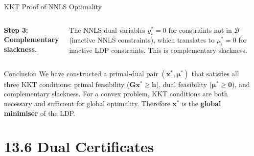 \documentclass[aspectratio=169,10pt]{beamer}
\newcommand{\bx}{\mathbf{x}}
\newcommand{\bG}{\mathbf{G}}
\newcommand{\bh}{\mathbf{h}}
\newcommand{\bmu}{\boldsymbol{\mu}}
\begin{document}
\begin{frame}[allowframebreaks]{KKT Proof of NNLS Optimality}
\begin{columns}[T]
      \textbf{Step 3: Complementary slackness.}

      The NNLS dual variables $y_i^* = 0$ for constraints not in $\mathcal{B}$
      (inactive NNLS constraints), which translates to $\mu_i^* = 0$ for inactive
      LDP constraints.  This is complementary slackness. \checkmark
  \end{columns}

  \begin{alertblock}{Conclusion}
    We have constructed a primal-dual pair $(\bx^*, \bmu^*)$ that satisfies all
    three KKT conditions: primal feasibility ($\bG\bx^* \geq \bh$), dual
    feasibility ($\bmu^* \geq \mathbf{0}$), and complementary slackness.  For a
    convex problem, KKT conditions are both necessary and sufficient for global
    optimality.  Therefore $\bx^*$ is the \textbf{global minimiser} of the LDP.
  \end{alertblock}

\end{frame}

\section{13.6 Dual Certificates}
\end{document}
